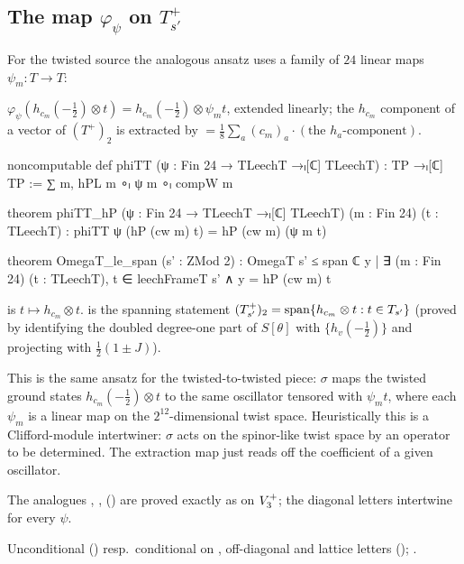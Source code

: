 \subsection{\texorpdfstring{The map $\varphi_\psi$ on $T_{s'}^+$}{The map varphipsi on Ts'+}}
For the twisted source the analogous ansatz uses a family of $24$ linear maps $\psi_m\colon T\to T$:
\begin{definition}\label{ch13:def:phiTT}
$\varphi_\psi(h_{c_m}(-\tfrac12)\otimes t)=h_{c_m}(-\tfrac12)\otimes\psi_m t$, extended linearly; the $h_{c_m}$
component of a vector of $(T^+)_2$ is extracted by 
$=\tfrac18\sum_a(c_m)_a\cdot(\text{the }h_a\text{-component})$.
\end{definition}
\begin{leancode}
noncomputable def phiTT (ψ : Fin 24 → TLeechT →ₗ[ℂ] TLeechT) : TP →ₗ[ℂ] TP :=
  ∑ m, hPL m ∘ₗ ψ m ∘ₗ compW m

theorem phiTT_hP (ψ : Fin 24 → TLeechT →ₗ[ℂ] TLeechT) (m : Fin 24) (t : TLeechT) :
    phiTT ψ (hP (cw m) t) = hP (cw m) (ψ m t)

theorem OmegaT_le_span (s' : ZMod 2) :
    OmegaT s' ≤ span ℂ {y | ∃ (m : Fin 24) (t : TLeechT), t ∈ leechFrameT s' ∧ y = hP (cw m) t}
\end{leancode}
\begin{dictionary}
 is $t\mapsto h_{c_m}\otimes t$.  is the spanning statement
$(T_{s'}^{+})_2=\operatorname{span}\{h_{c_m}\otimes t: t\in T_{s'}\}$ (proved by identifying the doubled
degree-one part of $S[\theta]$ with $\{h_v(-\tfrac12)\}$ and projecting with $\tfrac12(1\pm J)$).
\end{dictionary}
\begin{physics}
This is the same ansatz for the twisted-to-twisted piece: $\sigma$ maps the twisted ground states $h_{c_m}(-\tfrac12)\otimes t$ to the same oscillator tensored with $\psi_m t$, where each $\psi_m$ is a linear map on the $2^{12}$-dimensional twist space. Heuristically this is a Clifford-module intertwiner: $\sigma$ acts on the spinor-like twist space by an operator to be determined. The extraction map  just reads off the coefficient of a given oscillator.
\end{physics}
The analogues , , 
() are proved exactly as on $V_3^{+}$; the diagonal letters intertwine for
every $\psi$.
\begin{status}Unconditional () resp.\ conditional on ,
off-diagonal and lattice letters (); .\end{status}

